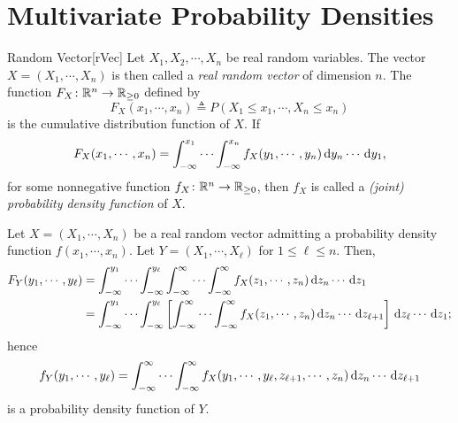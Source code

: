 \documentclass[../probability.tex]{subfiles}
\begin{document}
\section{Multivariate Probability Densities}

\begin{Definition}{Random Vector}[rVec]
    Let \(X_1, X_2, \cdots, X_n\) be real random variables.
    The vector \(X = (X_1, \cdots, X_n)\) is then called
    a \emph{real random vector} of dimension \(n\).
    The function \(F_X \colon \RR[n] \to \RR_{\ge 0}\) defined by
    \[
        F_X(x_1, \cdots, x_n) \triangleq P(X_1 \le x_1, \cdots, X_n \le x_n)
    \]
    is the cumulative distribution function of \(X\).
    If
    \[
        F_X(x_1, \cdots, x_n) = \int_{-\infty}^{x_1} \cdots \int_{-\infty}^{x_n} f_X(y_1, \cdots, y_n)
        \,\mathrm{d} y_n \cdots \,\mathrm{d} y_1\text,
    \]
    for some nonnegative function \(f_X \colon \RR[n] \to \RR_{\ge 0}\),
    then \(f_X\) is called a \emph{(joint) probability density function} of \(X\).
\end{Definition}

\begin{note}
    Let \(X = (X_1, \cdots, X_n)\) be a real random vector
    admitting a probability density function \(f(x_1, \cdots, x_n)\).
    Let \(Y = (X_1, \cdots, X_\ell)\) for \(1 \le \ell \le n\).
    Then,
    \begin{align*}
        F_Y(y_1, \cdots, y_\ell)
        &= \int_{-\infty}^{y_1} \cdots \int_{-\infty}^{y_\ell} \int_{-\infty}^\infty \cdots
        \int_{-\infty}^\infty f_X(z_1, \cdots, z_n) \,\mathrm{d} z_n \cdots \,\mathrm{d} z_1 \\
        &= \int_{-\infty}^{y_1} \cdots \int_{-\infty}^{y_\ell} \left[ \int_{-\infty}^\infty \cdots
        \int_{-\infty}^\infty f_X(z_1, \cdots, z_n) \,\mathrm{d} z_n \cdots \,\mathrm{d} z_{\ell+1} \right] \,\mathrm{d} z_\ell
        \cdots \,\mathrm{d} z_1\text;
    \end{align*}
    hence
    \[
        f_Y(y_1, \cdots, y_\ell) =
        \int_{-\infty}^\infty \cdots \int_{-\infty}^\infty f_X(y_1, \cdots, y_\ell, z_{\ell+1}, \cdots, z_n) \,\mathrm{d} z_{n} \cdots \,\mathrm{d}
        z_{\ell+1}
    \]
    is a probability density function of \(Y\).
\end{note}
\end{document}
